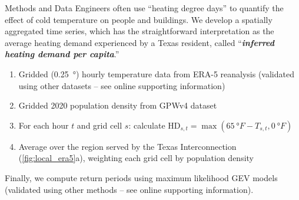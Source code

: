 \begin{block}{Methods and Data}
    Engineers often use ``heating degree days'' to quantify the effect of cold temperature on people and buildings.
    We develop a spatially aggregated time series, which has the straightforward interpretation as the average heating demand experienced by a Texas resident, called ``\textit{\textbf{inferred heating demand per capita}}.''
    \begin{enumerate}
        \item Gridded (\SI{0.25}{\degree}) hourly temperature data from ERA-5 reanalysis \cite{hersbach_era5:2020} (validated using other datasets -- see online supporting information)
        \item Gridded 2020 population density from GPWv4 dataset \cite{ciesin_gpwv4:2016}
        \item For each hour $t$ and grid cell $s$: calculate
              $\text{HD}_{s,t} = \max (\SI{65}{\degree F} - T_{s,t}, \SI{0}{\degree F})$
        \item Average over the region served by the Texas Interconnection (\cref{fig:local_era5}a), weighting each grid cell by population density
    \end{enumerate}
    Finally, we compute return periods using maximum likelihood GEV models (validated using other methods -- see online supporting information).
\end{block}